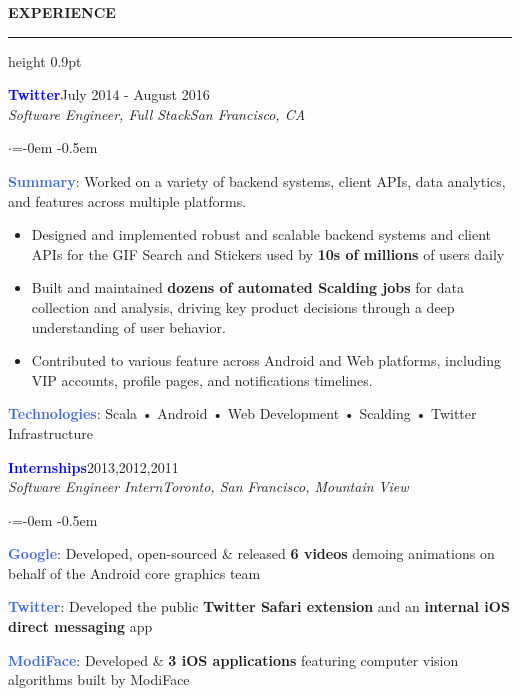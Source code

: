 \documentclass[
    11pt, %
]{resume} %
\newenvironment{rSectionCustom}[1]{
  \Large
  \sectionskip
  \textbf{\textcolor{Cerulean}{\MakeUppercase{#1}}}
  \vspace{0.5em}
  {\color{Blue}\hrule height 0.9pt}
  \vspace{0.25em}

  \begin{list}{}{
    \setlength{\leftmargin}{1.5em}
  }
  \item[]
}{
    \vspace{1em}
    \end{list}
}
\newenvironment{rSubsection2}[4]{
  \normalsize
  \hspace{-18pt}\textcolor{Blue}{\textbf{\large #1}}\hfill{#2}
  \\
  \hspace*{-18pt}\emph{#3}\hfill\emph{#4}
  \begin{list}{$\cdot$}{\leftmargin=-0em}
  \itemsep -0.5em \vspace{-0.25em}
}{
    \vspace{1em}
    \end{list}
}
\begin{document}
\begin{rSectionCustom}{Experience}
    \begin{rSubsection2}{Twitter}{July 2014 - August 2016}{Software Engineer, Full Stack}{San Francisco, CA}
        \item[] \textcolor{RoyalBlue}{\textbf{Summary}}: Worked on a variety of backend systems, client APIs, data analytics, and features across multiple platforms.
        \begin{itemize}[leftmargin=*]
            \item Designed and implemented robust and scalable backend systems and client APIs for the GIF Search and Stickers used by \textbf{10s of millions} of users daily
            \item Built and maintained \textbf{dozens of automated Scalding jobs} for data collection and analysis, driving key product decisions through a deep understanding of user behavior.
            \item Contributed to various feature across Android and Web platforms, including VIP accounts, profile pages, and notifications timelines.
            \end{itemize}
        \vspace{0.5em}
        \item[] \textcolor{RoyalBlue}{\textbf{Technologies}}: Scala • Android • Web Development • Scalding • Twitter Infrastructure
    \end{rSubsection2}

    \begin{rSubsection2}{Internships}{2013,2012,2011}{Software Engineer Intern}{Toronto, San Francisco, Mountain View}
        \item[] \textcolor{RoyalBlue}{\textbf{Google}}: Developed, open-sourced \& released \textbf{6 videos} demoing animations on behalf of the Android core graphics team
        \item[] \textcolor{RoyalBlue}{\textbf{Twitter}}: Developed the public \textbf{Twitter Safari extension} and an \textbf{internal iOS direct messaging}  app
        \item[] \textcolor{RoyalBlue}{\textbf{ModiFace}}: Developed & \released \textbf{3 iOS applications} featuring computer vision algorithms built by ModiFace
    \end{rSubsection2}



\end{rSectionCustom}

\vspace{-1.5em}
\end{document}
